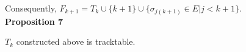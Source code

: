 \documentclass[a4paper,12pt]{article}
\numberwithin{equation}{section}
\begin{document}
	Consequently, $F_{k+1} = T_k \cup \{k+1\} \cup \{ \sigma_{j(k+1)} \in E \vert j < k+1 \}.$\\
	
	\noindent \textbf{Proposition 7}
	
	$T_k$ constructed above is tracktable.
	
	
	
	
	
	
	


	
\end{document}
